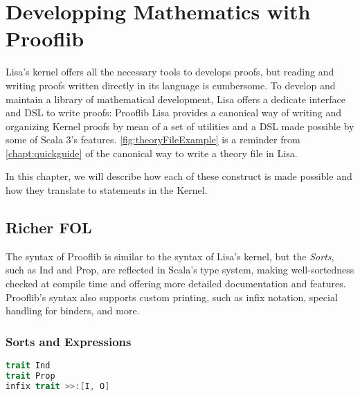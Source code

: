 \chapter{Developping Mathematics with Prooflib}
\label{chapt:prooflib}
Lisa's kernel offers all the necessary tools to develops proofs, but  reading and writing proofs written directly in its language is cumbersome. 
To develop and maintain a library of mathematical development, Lisa offers a dedicate interface and DSL to write proofs: Prooflib
Lisa provides a canonical way of writing and organizing Kernel proofs by mean of a set of utilities and a DSL made possible by some of Scala 3's features.
\autoref{fig:theoryFileExample} is a reminder from \autoref{chapt:quickguide} of the canonical way to write a theory file in Lisa.

\begin{figure}
\end{figure}

In this chapter, we will describe how each of these construct is made possible and how they translate to statements in the Kernel.

\section{Richer FOL}

The syntax of Prooflib is similar to the syntax of Lisa's kernel, but the \textit{Sorts}, such as Ind and Prop, are reflected in Scala's type system, making well-sortedness checked at compile time and offering more detailed documentation and features. Prooflib's syntax also supports custom printing, such as infix notation, special handling for binders, and more.

\subsection{Sorts and Expressions}

\begin{definition}[Sorts]\phantom{.}
  \begin{lstlisting}[language=scala]
trait Ind
trait Prop
infix trait >>:[I, O]
  \end{lstlisting}
  
\end{definition}

